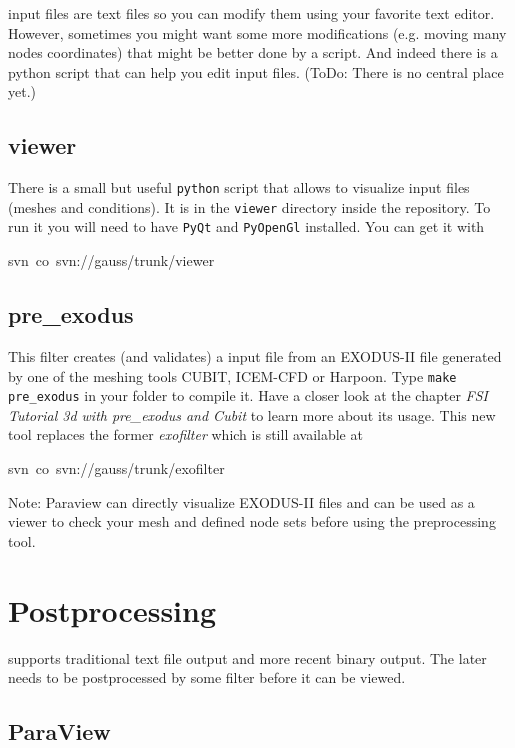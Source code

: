 \ccarat{} input files are text files so you can modify them using
your favorite text editor. However, sometimes you might want some
more modifications (e.g. moving many nodes coordinates) that might
be better done by a script. And indeed there is a python script that
can help you edit input files. (ToDo: There is no central place yet.)


\subsection{viewer}

There is a small but useful \texttt{python} script that allows to
visualize \ccarat{} input files (meshes and conditions). It is in
the \texttt{viewer} directory inside the repository. To run it you
will need to have \texttt{PyQt} and \texttt{PyOpenGl} installed. You
can get it with

\begin{lyxcode}
svn~co~svn://gauss/trunk/viewer
\end{lyxcode}

\subsection{pre\_exodus}\label{beginner:sec:preexodus}
This filter creates (and validates) a \baci{} input file from an EXODUS-II file
generated by one of the meshing tools CUBIT, ICEM-CFD or Harpoon. Type
\texttt{make pre\_exodus} in your \baci{} folder to compile it.
Have a closer look at the chapter \emph{FSI Tutorial 3d with pre\_exodus and Cubit}
to learn more about its usage.
This new tool replaces the former \emph{exofilter} which is still available at
\begin{lyxcode}
svn~co~svn://gauss/trunk/exofilter
\end{lyxcode}
Note: Paraview can directly visualize EXODUS-II files and can be used
as a viewer to check your mesh and defined node sets before using the
preprocessing tool.


\section{Postprocessing}

\baci{} supports traditional text file output and more recent binary
output. The later needs to be postprocessed by some filter before
it can be viewed.


\subsection{ParaView}

